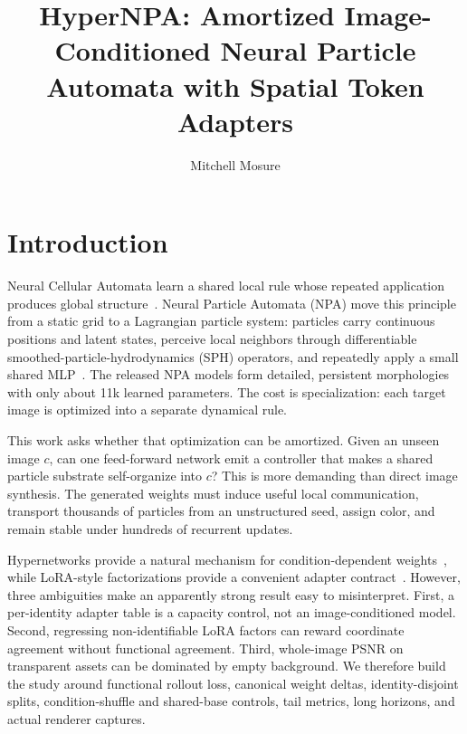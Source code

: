 \documentclass[sigconf,nonacm]{acmart}
\title{HyperNPA: Amortized Image-Conditioned Neural Particle Automata with Spatial Token Adapters}
\author{Mitchell Mosure}
\affiliation{%
  \institution{Independent Research}
  \city{Remote}
  \country{USA}
}
\begin{document}
\maketitle

\section{Introduction}

Neural Cellular Automata learn a shared local rule whose repeated application
produces global structure~\cite{mordvintsev2020growing}. Neural Particle
Automata (NPA) move this principle from a static grid to a Lagrangian particle
system: particles carry continuous positions and latent states, perceive local
neighbors through differentiable smoothed-particle-hydrodynamics (SPH)
operators, and repeatedly apply a small shared MLP~\cite{kim2026npa}. The
released NPA models form detailed, persistent morphologies with only about
11k learned parameters. The cost is specialization: each target image is
optimized into a separate dynamical rule.

This work asks whether that optimization can be amortized. Given an unseen
image $c$, can one feed-forward network emit a controller that makes a shared
particle substrate self-organize into $c$? This is more demanding than direct
image synthesis. The generated weights must induce useful local communication,
transport thousands of particles from an unstructured seed, assign color, and
remain stable under hundreds of recurrent updates.

Hypernetworks provide a natural mechanism for condition-dependent
weights~\cite{ha2016hypernetworks}, while LoRA-style factorizations provide a
convenient adapter contract~\cite{hu2021lora}. However, three ambiguities make
an apparently strong result easy to misinterpret. First, a per-identity
adapter table is a capacity control, not an image-conditioned model. Second,
regressing non-identifiable LoRA factors can reward coordinate agreement
without functional agreement. Third, whole-image PSNR on transparent assets
can be dominated by empty background. We therefore build the study around
functional rollout loss, canonical weight deltas, identity-disjoint splits,
condition-shuffle and shared-base controls, tail metrics, long horizons, and
actual renderer captures.
\end{document}
